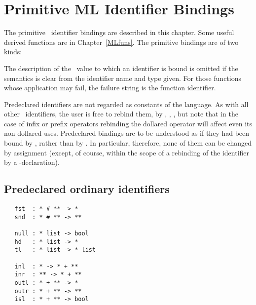 \chapter{Primitive ML Identifier Bindings}
\label{MLprims}

The primitive \ML\ identifier bindings are described in this chapter.
Some useful derived functions are in Chapter~\ref{MLfuns}.
The primitive bindings are of two kinds:


The description of the \ML\ value to which an identifier is bound
is omitted if the semantics is clear from the identifier name and type 
given.  For
those functions whose application may fail, the failure string is the
function identifier.

Predeclared identifiers
 are not regarded as constants of
the language.  As with all other \ML\ identifiers, the user is free to
rebind them, by , , \etc, but note that in the
case of infix or prefix operators rebinding the dollared operator will
affect even its non-dollared uses.  Predeclared bindings are to be
understood as if they had been bound by , rather than 
by . In
particular, therefore, none of them can be changed by assignment
(except, of course, within the scope of a rebinding of the identifier by
a -declaration).

\section{Predeclared ordinary identifiers}
\label{avra_predeclared}


\begin{boxed}
\begin{verbatim}
   fst  : * # ** -> *
   snd  : * # ** -> **

   null : * list -> bool
   hd   : * list -> *
   tl   : * list -> * list

   inl  : * -> * + **
   inr  : ** -> * + **
   outl : * + ** -> *
   outr : * + ** -> **
   isl  : * + ** -> bool
\end{verbatim}\end{boxed}

